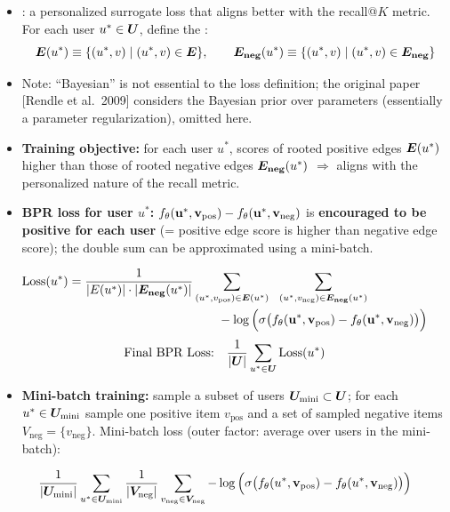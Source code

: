 \begin{itemize}
  \item {}: a personalized surrogate loss that aligns better with
    the recall@$K$ metric. For each user $u^*\in\bm{U}$, define the
    :
    \begin{equation}\label{eq:lec11-rooted}
      \bm{E}(u^*)\equiv\{(u^*,v)\mid(u^*,v)\in\bm{E}\},\qquad
      \bm{E}_{\mathbf{neg}}(u^*)\equiv\{(u^*,v)\mid(u^*,v)\in\bm{E}_{\mathbf{neg}}\}
    \end{equation}
  \item Note: ``Bayesian'' is not essential to the loss definition; the
    original paper [Rendle et al.\ 2009] considers the Bayesian prior over
    parameters (essentially a parameter regularization), omitted here.
  \item \textbf{Training objective:} for each user $u^*$, scores of rooted
    positive edges $\bm{E}(u^*)$ higher than those of rooted negative edges
    $\bm{E}_{\mathbf{neg}}(u^*)$ $\Rightarrow$ aligns with the personalized nature of the
    recall metric.
  \item \textbf{BPR loss for user $u^*$:}
    $f_\theta(\mathbf{u}^*,\mathbf{v}_{\mathrm{pos}})-f_\theta(\mathbf{u}^*,\mathbf{v}_{\mathrm{neg}})$ is \textbf{encouraged to be
    positive for each user} (= positive edge score is higher than negative edge
    score); the double sum can be approximated using a mini-batch.
\end{itemize}
\begin{equation}\label{eq:lec11-bpr-user}
  \begin{split}
  \mathrm{Loss}(u^*)=\frac{1}{|E(u^*)|\cdot|\bm{E}_{\mathbf{neg}}(u^*)|}
  &\sum_{(u^*,v_{\mathrm{pos}})\in\bm{E}(u^*)}\ \
  \sum_{(u^*,v_{\mathrm{neg}})\in\bm{E}_{\mathbf{neg}}(u^*)}\\
  &\qquad
  -\log\Big(\sigma\big(f_\theta(\mathbf{u}^*,\mathbf{v}_{\mathrm{pos}})-f_\theta(\mathbf{u}^*,\mathbf{v}_{\mathrm{neg}})\big)\Big)
  \end{split}
\end{equation}
\begin{equation}\label{eq:lec11-bpr}
  \text{Final BPR Loss:}\quad\frac{1}{|\bm{U}|}\sum_{u^*\in\bm{U}}\mathrm{Loss}(u^*)
\end{equation}
\begin{itemize}
  \item \textbf{Mini-batch training:} sample a subset of users
    $\bm{U}_{\mathrm{mini}}\subset\bm{U}$; for each $u^*\in\bm{U}_{\mathrm{mini}}$ sample one positive item
    $v_{\mathrm{pos}}$ and a set of sampled negative items
    $V_{\mathrm{neg}}=\{v_{\mathrm{neg}}\}$. Mini-batch loss (outer factor:
    average over users in the mini-batch):
\end{itemize}
\begin{equation}\label{eq:lec11-bpr-mini}
  \frac{1}{|\bm{U}_{\mathrm{mini}}|}\sum_{u^*\in\bm{U}_{\mathrm{mini}}}\frac{1}{|\bm{V}_{\mathrm{neg}}|}
  \sum_{v_{\mathrm{neg}}\in\bm{V}_{\mathrm{neg}}}
  -\log\Big(\sigma\big(f_\theta(u^*,\mathbf{v}_{\mathrm{pos}})-f_\theta(u^*,\mathbf{v}_{\mathrm{neg}})\big)\Big)
\end{equation}


